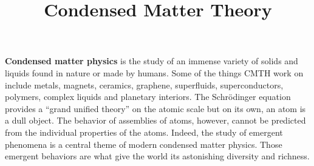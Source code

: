 \documentclass[xcolor={table}]{beamer}
\title{\Huge Condensed Matter Theory}
\begin{document}
\small
\begin{frame}[fragile=singleslide,t]\centering

\maketitle

\begin{tcolorbox}[colback=BackgroundBlue,colframe=ICDeepBlue,fontupper=\color{ICDeepBlue}]
\normalsize
    {\bf Condensed matter physics} is the study of an immense variety of solids and
    liquids found in nature or made by humans. Some of the things CMTH work on include metals, magnets, ceramics, graphene, superfluids, superconductors, polymers, complex liquids and planetary interiors. The Schr{\"o}dinger equation provides a ``grand unified theory'' on the atomic scale but on its own, an atom is a dull object. The behavior of assemblies of atoms, however, cannot be predicted from the individual properties of the atoms. Indeed, the study of emergent phenomena is a central theme of modern condensed matter physics. Those emergent behaviors are what give the world its astonishing diversity and richness.
\end{tcolorbox}

\begin{columns}[onlytextwidth,T]

\begin{column}{.47\textwidth}


\end{column}
\end{columns}
\end{frame}
\end{document}

